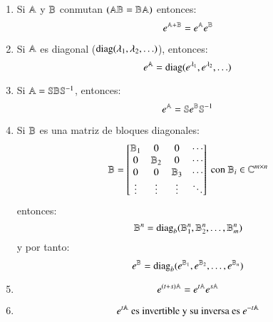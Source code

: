 \begin{pro}
\begin{enumerate}
    \item Si $\mathbb{A}$ y $\mathbb{B}$ conmutan $(\mathbb{A}\mathbb{B} = \mathbb{B}\mathbb{A})$ entonces:
    $$
        e^{\mathbb{A}+\mathbb{B}} = e^{\mathbb{A}} e^{\mathbb{B}}
    $$
    \item Si $\mathbb{A}$ es diagonal ($\operatorname{diag}(\lambda_1, \lambda_2,\ldots)$), entonces:
    $$
        e^{\mathbb{A}} = \operatorname{diag}(e^{\lambda_1}, e^{\lambda_2}, \ldots)
    $$
    \item Si $\mathbb{A} = \mathbb{S} \mathbb{B} \mathbb{S}^{-1}$, entonces:
    $$
        e^{\mathbb{A}} = \mathbb{S} e^{\mathbb{B}} \mathbb{S}^{-1}
    $$
    \item Si $\mathbb{B}$ es una matriz de bloques diagonales:
    $$
        \B = \mx{\B_1 & 0 & 0 & \cdots \\
            0  & \B_2 & 0 & \cdots\\
            0 & 0 & \B_3 & \cdots\\
            \vdots & \vdots & \vdots & \ddots} \text{ con } \B_i \in \C^{m\times n}
    $$
    entonces:
    $$
        \mathbb{B}^n = \operatorname{diag}_b(\mathbb{B}_1^n, \mathbb{B}_2^n, \ldots, \mathbb{B}_m^n)
    $$
    y por tanto:
    $$
        e^{\mathbb{B}} = \operatorname{diag}_b(e^{\mathbb{B}_1},e^{\mathbb{B}_2},\ldots,e^{\mathbb{B}_n})
    $$
    \item
        $$
            e^{(t+s)\mathbb{A}} = e^{t\mathbb{A}}e^{s\mathbb{A}}
        $$
    \item
        $$
            e^{t\mathbb{A}} \text{ es invertible y su inversa es } e^{-t\mathbb{A}}
        $$
\end{enumerate}
\end{pro}

